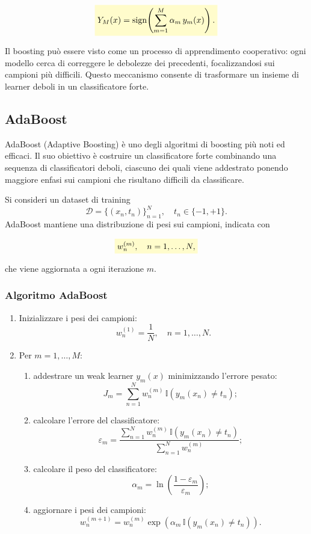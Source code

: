 \documentclass[a4paper,12pt]{report}
\newcommand{\highlight}[1]{%
\colorbox{yellow!20}{$\displaystyle #1$}%
}
\begin{document}
\[
\highlight{
Y_M(x) = \mathrm{sign}\!\left(\sum_{m=1}^{M} \alpha_m\, y_m(x)\right).}
\]

Il boosting può essere visto come un processo di apprendimento cooperativo: ogni modello cerca di correggere le debolezze dei precedenti, focalizzandosi sui campioni più difficili. Questo meccanismo consente di trasformare un insieme di learner deboli in un classificatore forte.

\subsection{AdaBoost}

AdaBoost (Adaptive Boosting) è uno degli algoritmi di boosting più noti ed efficaci. Il suo obiettivo è costruire un classificatore forte combinando una sequenza di classificatori deboli, ciascuno dei quali viene addestrato ponendo maggiore enfasi sui campioni che risultano difficili da classificare.

Si consideri un dataset di training
\[
\mathcal{D} = \{(x_n, t_n)\}_{n=1}^N,
\quad t_n \in \{-1, +1\}.
\]
AdaBoost mantiene una distribuzione di pesi sui campioni, indicata con

\[
\highlight{
w_n^{(m)}, \quad n=1,\dots,N,}
\]

che viene aggiornata a ogni iterazione $m$.

\subsubsection*{Algoritmo AdaBoost}

\begin{enumerate}
    \item Inizializzare i pesi dei campioni:
    \[
    w_n^{(1)} = \frac{1}{N}, \quad n = 1, \dots, N.
    \]

    \item Per $m = 1, \dots, M$:
    \begin{enumerate}
        \item addestrare un weak learner $y_m(x)$ minimizzando l’errore pesato:
        \[
        J_m = \sum_{n=1}^{N} w_n^{(m)} \, \mathbb{I}(y_m(x_n) \neq t_n);
        \]
        \item calcolare l’errore del classificatore:
        \[
        \varepsilon_m =
        \frac{\sum_{n=1}^{N} w_n^{(m)} \, \mathbb{I}(y_m(x_n) \neq t_n)}
        {\sum_{n=1}^{N} w_n^{(m)}};
        \]
        \item calcolare il peso del classificatore:
        \[
        \alpha_m = \ln\!\left(\frac{1-\varepsilon_m}{\varepsilon_m}\right);
        \]
        \item aggiornare i pesi dei campioni:
        \[
        w_n^{(m+1)} = w_n^{(m)} \exp\!\left(\alpha_m \, \mathbb{I}(y_m(x_n) \neq t_n)\right).
        \]
    \end{enumerate}
\end{enumerate}
\end{document}
